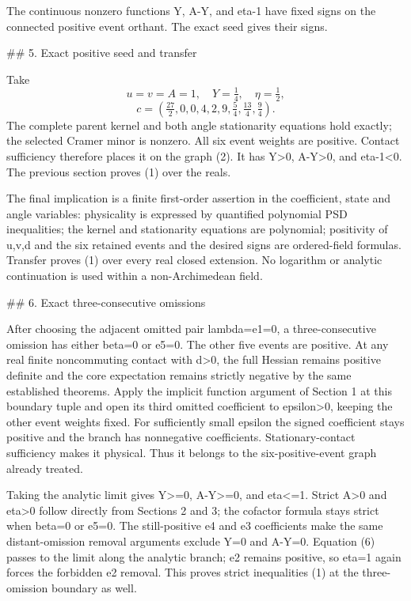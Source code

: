 The continuous nonzero functions Y, A-Y, and eta-1 have fixed signs on the
connected positive event orthant. The exact seed gives their signs.

## 5. Exact positive seed and transfer

Take
\[
u=v=A=1,\quad Y=\tfrac14,\quad\eta=\tfrac12,
\]
\[
c=\left(\tfrac{27}{2},0,0,4,2,9,\tfrac54,
                 \tfrac{13}{4},\tfrac94\right).
\tag{7}
\]
The complete parent kernel and both angle stationarity equations hold
exactly; the selected Cramer minor is nonzero. All six event weights are
positive. Contact sufficiency therefore places it on the graph (2). It
has Y>0, A-Y>0, and eta-1<0. The previous section proves (1) over the reals.

The final implication is a finite first-order assertion in the coefficient,
state and angle variables: physicality is expressed by quantified
polynomial PSD inequalities; the kernel and stationarity equations are
polynomial; positivity of u,v,d and the six retained events and the desired
signs are ordered-field formulas. Transfer proves (1) over every real
closed extension. No logarithm or analytic continuation is used within a
non-Archimedean field.

## 6. Exact three-consecutive omissions

After choosing the adjacent omitted pair lambda=e1=0, a three-consecutive
omission has either beta=0 or e5=0. The other five events are positive.
At any real finite noncommuting contact with d>0, the full Hessian remains
positive definite and the core expectation remains strictly negative by
the same established theorems. Apply the implicit function argument of
Section 1 at this boundary tuple and open its third omitted coefficient
to epsilon>0, keeping the other event weights fixed. For sufficiently
small epsilon the signed coefficient stays positive and the branch has
nonnegative coefficients. Stationary-contact sufficiency makes it physical.
Thus it belongs to the six-positive-event graph already treated.

Taking the analytic limit gives Y>=0, A-Y>=0, and eta<=1. Strict A>0 and
eta>0 follow directly from Sections 2 and 3; the cofactor formula stays
strict when beta=0 or e5=0. The still-positive e4 and e3 coefficients make
the same distant-omission removal arguments exclude Y=0 and A-Y=0.
Equation (6) passes to the limit along the analytic branch; e2 remains
positive, so eta=1 again forces the forbidden e2 removal. This proves
strict inequalities (1) at the three-omission boundary as well.

